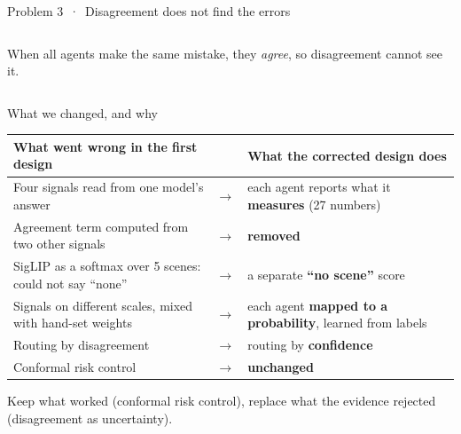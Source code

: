 \documentclass[aspectratio=169,10pt]{beamer}
\newcommand{\takeaway}[1]{\vfill\begin{keybox}#1\end{keybox}}
\begin{document}
\begin{frame}{Problem 3 \,·\, Disagreement does not find the errors}
\begin{columns}[T,onlytextwidth]
\begin{keybox}[colback=persbg,colframe=pers]
When all agents make the same mistake, they \emph{agree}, so disagreement cannot see it.
\end{keybox}
\end{columns}
\end{frame}

\begin{frame}{What we changed, and why}
\footnotesize
\renewcommand{\arraystretch}{1.15}
\begin{tabularx}{\textwidth}{@{}>{\raggedright\arraybackslash\color{oldc}}X c >{\raggedright\arraybackslash\color{navy}}X@{}}
\toprule
\textbf{What went wrong in the first design} & & \textbf{What the corrected design does}\\
\midrule
Four signals read from one model's answer & $\to$ & each agent reports what it \textbf{measures} (27 numbers)\\
Agreement term computed from two other signals & $\to$ & \textbf{removed}\\
SigLIP as a softmax over 5 scenes: could not say ``none'' & $\to$ & a separate \textbf{``no scene''} score\\
Signals on different scales, mixed with hand-set weights & $\to$ & each agent \textbf{mapped to a probability}, learned from labels\\
Routing by disagreement & $\to$ & routing by \textbf{confidence}\\
Conformal risk control & $\to$ & \textbf{unchanged}\\
\bottomrule
\end{tabularx}
\takeaway{Keep what worked (conformal risk control), replace what the evidence rejected (disagreement as uncertainty).}
\end{frame}

\end{document}
